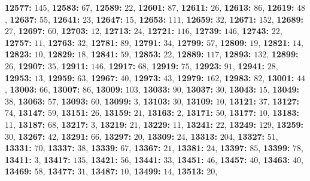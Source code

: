 \textsf{\bfseries 12577:} $145$, \textsf{\bfseries 12583:} $67$, \textsf{\bfseries 12589:} $22$, \textsf{\bfseries 12601:} $87$, \textsf{\bfseries 12611:} $26$, \textsf{\bfseries 12613:} $86$, \textsf{\bfseries 12619:} $48$, \textsf{\bfseries 12637:} $55$, \textsf{\bfseries 12641:} $23$, \textsf{\bfseries 12647:} $15$, \textsf{\bfseries 12653:} $111$, \textsf{\bfseries 12659:} $32$, \textsf{\bfseries 12671:} $152$, \textsf{\bfseries 12689:} $27$, \textsf{\bfseries 12697:} $60$, \textsf{\bfseries 12703:} $12$, \textsf{\bfseries 12713:} $24$, \textsf{\bfseries 12721:} $116$, \textsf{\bfseries 12739:} $146$, \textsf{\bfseries 12743:} $22$, \textsf{\bfseries 12757:} $11$, \textsf{\bfseries 12763:} $32$, \textsf{\bfseries 12781:} $89$, \textsf{\bfseries 12791:} $34$, \textsf{\bfseries 12799:} $57$, \textsf{\bfseries 12809:} $19$, \textsf{\bfseries 12821:} $14$, \textsf{\bfseries 12823:} $10$, \textsf{\bfseries 12829:} $18$, \textsf{\bfseries 12841:} $59$, \textsf{\bfseries 12853:} $22$, \textsf{\bfseries 12889:} $117$, \textsf{\bfseries 12893:} $132$, \textsf{\bfseries 12899:} $26$, \textsf{\bfseries 12907:} $35$, \textsf{\bfseries 12911:} $146$, \textsf{\bfseries 12917:} $68$, \textsf{\bfseries 12919:} $75$, \textsf{\bfseries 12923:} $91$, \textsf{\bfseries 12941:} $28$, \textsf{\bfseries 12953:} $13$, \textsf{\bfseries 12959:} $63$, \textsf{\bfseries 12967:} $40$, \textsf{\bfseries 12973:} $43$, \textsf{\bfseries 12979:} $162$, \textsf{\bfseries 12983:} $82$, \textsf{\bfseries 13001:} $44$, \textsf{\bfseries 13003:} $66$, \textsf{\bfseries 13007:} $86$, \textsf{\bfseries 13009:} $103$, \textsf{\bfseries 13033:} $90$, \textsf{\bfseries 13037:} $30$, \textsf{\bfseries 13043:} $15$, \textsf{\bfseries 13049:} $38$, \textsf{\bfseries 13063:} $57$, \textsf{\bfseries 13093:} $60$, \textsf{\bfseries 13099:} $3$, \textsf{\bfseries 13103:} $30$, \textsf{\bfseries 13109:} $10$, \textsf{\bfseries 13121:} $37$, \textsf{\bfseries 13127:} $74$, \textsf{\bfseries 13147:} $59$, \textsf{\bfseries 13151:} $26$, \textsf{\bfseries 13159:} $21$, \textsf{\bfseries 13163:} $2$, \textsf{\bfseries 13171:} $50$, \textsf{\bfseries 13177:} $10$, \textsf{\bfseries 13183:} $11$, \textsf{\bfseries 13187:} $68$, \textsf{\bfseries 13217:} $3$, \textsf{\bfseries 13219:} $21$, \textsf{\bfseries 13229:} $11$, \textsf{\bfseries 13241:} $22$, \textsf{\bfseries 13249:} $129$, \textsf{\bfseries 13259:} $30$, \textsf{\bfseries 13267:} $42$, \textsf{\bfseries 13291:} $66$, \textsf{\bfseries 13297:} $20$, \textsf{\bfseries 13309:} $24$, \textsf{\bfseries 13313:} $204$, \textsf{\bfseries 13327:} $51$, \textsf{\bfseries 13331:} $70$, \textsf{\bfseries 13337:} $38$, \textsf{\bfseries 13339:} $67$, \textsf{\bfseries 13367:} $21$, \textsf{\bfseries 13381:} $24$, \textsf{\bfseries 13397:} $85$, \textsf{\bfseries 13399:} $78$, \textsf{\bfseries 13411:} $3$, \textsf{\bfseries 13417:} $135$, \textsf{\bfseries 13421:} $56$, \textsf{\bfseries 13441:} $33$, \textsf{\bfseries 13451:} $46$, \textsf{\bfseries 13457:} $40$, \textsf{\bfseries 13463:} $40$, \textsf{\bfseries 13469:} $58$, \textsf{\bfseries 13477:} $31$, \textsf{\bfseries 13487:} $10$, \textsf{\bfseries 13499:} $14$, \textsf{\bfseries 13513:} $20$, 
